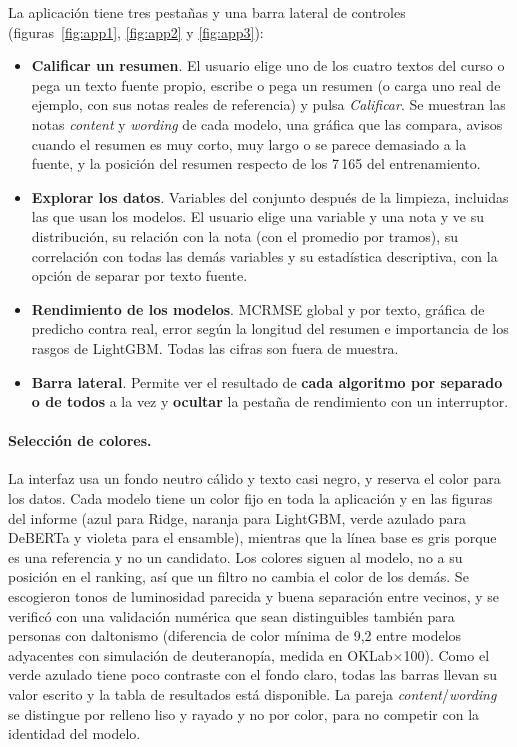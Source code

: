 \documentclass[11pt,a4paper]{article}
\begin{document}
La aplicación tiene tres pestañas y una barra lateral de controles (figuras~\ref{fig:app1}, \ref{fig:app2} y \ref{fig:app3}):
\begin{itemize}[nosep]
\item \textbf{Calificar un resumen}. El usuario elige uno de los cuatro textos del curso o pega un texto fuente propio, escribe o pega un resumen (o carga uno real de ejemplo, con sus notas reales de referencia) y pulsa \emph{Calificar}. Se muestran las notas \emph{content} y \emph{wording} de cada modelo, una gráfica que las compara, avisos cuando el resumen es muy corto, muy largo o se parece demasiado a la fuente, y la posición del resumen respecto de los 7\,165 del entrenamiento.
\item \textbf{Explorar los datos}. Variables del conjunto después de la limpieza, incluidas las que usan los modelos. El usuario elige una variable y una nota y ve su distribución, su relación con la nota (con el promedio por tramos), su correlación con todas las demás variables y su estadística descriptiva, con la opción de separar por texto fuente.
\item \textbf{Rendimiento de los modelos}. MCRMSE global y por texto, gráfica de predicho contra real, error según la longitud del resumen e importancia de los rasgos de LightGBM. Todas las cifras son fuera de muestra.
\item \textbf{Barra lateral}. Permite ver el resultado de \textbf{cada algoritmo por separado o de todos} a la vez y \textbf{ocultar} la pestaña de rendimiento con un interruptor.
\end{itemize}

\paragraph{Selección de colores.} La interfaz usa un fondo neutro cálido y texto casi negro, y reserva el color para los datos. Cada modelo tiene un color fijo en toda la aplicación y en las figuras del informe (azul para Ridge, naranja para LightGBM, verde azulado para DeBERTa y violeta para el ensamble), mientras que la línea base es gris porque es una referencia y no un candidato. Los colores siguen al modelo, no a su posición en el ranking, así que un filtro no cambia el color de los demás. Se escogieron tonos de luminosidad parecida y buena separación entre vecinos, y se verificó con una validación numérica que sean distinguibles también para personas con daltonismo (diferencia de color mínima de 9,2 entre modelos adyacentes con simulación de deuteranopía, medida en OKLab$\times$100). Como el verde azulado tiene poco contraste con el fondo claro, todas las barras llevan su valor escrito y la tabla de resultados está disponible. La pareja \emph{content}/\emph{wording} se distingue por relleno liso y rayado y no por color, para no competir con la identidad del modelo.
\end{document}

